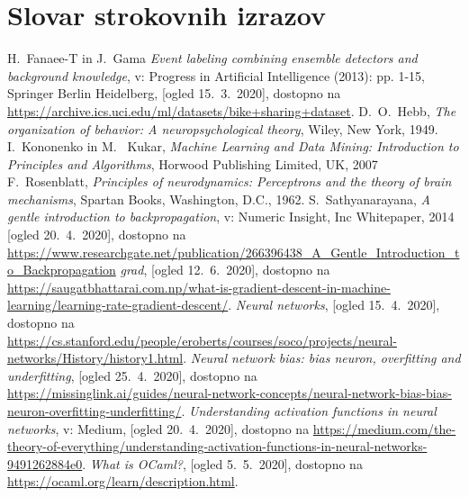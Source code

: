 \documentclass[mat1]{fmfdelo}
\begin{document}
\section*{Slovar strokovnih izrazov}
%


\begin{thebibliography}{99}
%
H.~Fanaee-T in J.~Gama \emph{Event labeling combining ensemble detectors and background knowledge}, v:  Progress in Artificial Intelligence (2013): pp. 1-15, Springer Berlin Heidelberg, [ogled 15.~3.~2020], dostopno na \url{https://archive.ics.uci.edu/ml/datasets/bike+sharing+dataset}.
%
D.~O.~Hebb, \emph{The organization of behavior: A neuropsychological theory}, Wiley, New York, 1949.
%
I.~Kononenko in M.~ Kukar, \emph{Machine Learning and Data Mining: Introduction to Principles and Algorithms}, Horwood Publishing Limited, UK, 2007
%
F.~Rosenblatt, \emph{Principles of neurodynamics: Perceptrons and the theory of brain mechanisms}, Spartan Books,  Washington, D.C., 1962.
%
S.~Sathyanarayana, \emph{A gentle introduction to backpropagation}, v: Numeric Insight, Inc Whitepaper, 2014 [ogled 20.~4.~2020], dostopno na \url{https://www.researchgate.net/publication/266396438_A_Gentle_Introduction_to_Backpropagation}
%
\emph{grad}, [ogled 12.~6.~2020], dostopno na \url{https://saugatbhattarai.com.np/what-is-gradient-descent-in-machine-learning/learning-rate-gradient-descent/}.
%
\emph{Neural networks}, [ogled 15.~4.~2020], dostopno na \url{https://cs.stanford.edu/people/eroberts/courses/soco/projects/neural-networks/History/history1.html}.
%
\emph{Neural network bias: bias neuron, overfitting and underfitting}, [ogled 25.~4.~2020], dostopno na \url{https://missinglink.ai/guides/neural-network-concepts/neural-network-bias-bias-neuron-overfitting-underfitting/}.
%
\emph{Understanding activation functions in neural networks}, v: Medium, [ogled 20.~4.~2020], dostopno na \url{https://medium.com/the-theory-of-everything/understanding-activation-functions-in-neural-networks-9491262884e0}.
%
 \emph{What is OCaml?}, [ogled 5.~5.~2020], dostopno na \url{https://ocaml.org/learn/description.html}.
%
\end{thebibliography}
\end{document}
